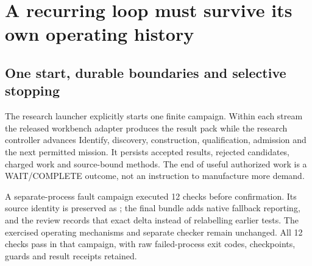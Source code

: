\section{A recurring loop must survive its own operating history}

\subsection{One start, durable boundaries and selective stopping}

The research launcher explicitly starts one finite campaign. Within each stream the released workbench adapter produces the result pack while the research controller advances Identify, discovery, construction, qualification, admission and the next permitted mission. It persists accepted results, rejected candidates, charged work and source-bound methods. The end of useful authorized work is a WAIT/COMPLETE outcome, not an instruction to manufacture more demand.

A separate-process fault campaign executed 12 checks before confirmation. Its source identity is preserved as ; the final  bundle adds native fallback reporting, and the review records that exact delta instead of relabelling earlier tests. The exercised operating mechanisms and separate checker remain unchanged. All 12 checks pass in that campaign, with raw failed-process exit codes, checkpoints, guards and result receipts retained.

